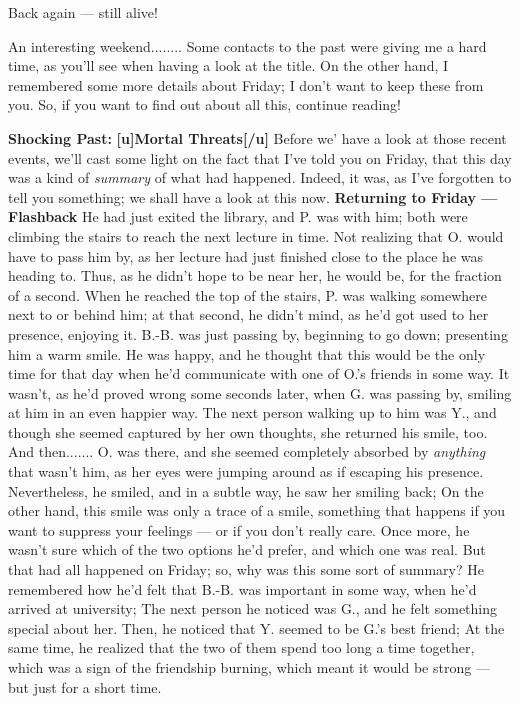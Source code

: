 Back again --- still alive!

An interesting weekend........
Some contacts to the past were giving me a hard time, as you'll see when having a look at the title. On the other hand, I remembered some more details about Friday; I don't want to keep these from you. 
So, if you want to find out about all this, continue reading!

\textbf{Shocking Past:}
\textbf{[u]Mortal Threats[/u]}
Before we' have a look at those recent events, we'll cast some light on the fact that I've told you on Friday, that this day was a kind of \emph{summary} of what had happened. Indeed, it was, as I've forgotten to tell you something; we shall have a look at this now. 
\textbf{Returning to Friday --- Flashback}
He had just exited the library, and P. was with him; both were climbing the stairs to reach the next lecture in time. Not realizing that O. would have to pass him by, as her lecture had just finished close to the place he was heading to. 
Thus, as he didn't hope to be near her, he would be, for the fraction of a second. When he reached the top of the stairs, P. was walking somewhere next to or behind him; at that second, he didn't mind, as he'd got used to her presence, enjoying it. B.-B. was just passing by, beginning to go down; presenting him a warm smile. He was happy, and he thought that this would be the only time for that day when he'd communicate with one of O.'s friends in some way. 
It wasn't, as he'd proved wrong some seconds later, when G. was passing by, smiling at him in an even happier way. The next person walking up to him was Y., and though she seemed captured by her own thoughts, she returned his smile, too. And then....... O. was there, and she seemed completely absorbed by \emph{anything} that wasn't him, as her eyes were jumping around as if escaping his presence. Nevertheless, he smiled, and in a subtle way, he saw her smiling back; On the other hand, this smile was only a trace of a smile, something that happens if you want to suppress your feelings --- or if you don't really care. 
Once more, he wasn't sure which of the two options he'd prefer, and which one was real. 
But that had all happened on Friday; so, why was this some sort of summary?
He remembered how he'd felt that B.-B. was important in some way, when he'd arrived at university; The next person he noticed was G., and he felt something special about her. Then, he noticed that Y. seemed to be G.'s best friend; At the same time, he realized that the two of them spend too long a time together, which was a sign of the friendship burning, which meant it would be strong --- but just for a short time. 
